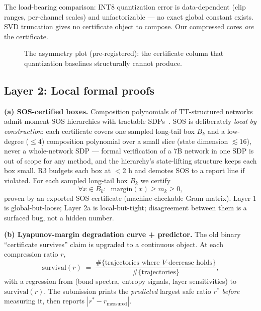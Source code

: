 \documentclass[conference,10pt]{IEEEtran}
\begin{document}
The load-bearing comparison: INT8 quantization error is data-dependent
(clip ranges, per-channel scales) and unfactorizable --- no exact global
constant exists. SVD truncation gives no certificate object to compose. Our
compressed cores \emph{are} the certificate.

\begin{figure}[!t]
\centering
{}
\caption{The asymmetry plot (pre-registered): the certificate column that
quantization baselines structurally cannot produce.}
\label{fig:safeset}
\end{figure}

\subsection{Layer 2: Local formal proofs}

\textbf{(a) SOS-certified boxes.} Composition polynomials of TT-structured
networks admit moment-SOS hierarchies with tractable SDPs~\cite{sos-tt}.
SOS is deliberately \emph{local by construction}: each certificate covers one
sampled long-tail box $B_k$ and a low-degree ($\le 4$) composition polynomial
over a small slice (state dimension $\lesssim 16$), never a whole-network SDP
--- formal verification of a 7B network in one SDP is out of scope for any
method, and the hierarchy's state-lifting structure keeps each box small.
R3 budgets each box at $<$2 h and demotes SOS to a report line if violated.
For each sampled long-tail box $B_k$ we certify
\begin{equation}
\forall x \in B_k:\;\; \mathrm{margin}(x) \ge m_k \ge 0,
\end{equation}
proven by an exported SOS certificate (machine-checkable Gram matrix).
Layer 1 is global-but-loose; Layer 2a is local-but-tight; disagreement between
them is a surfaced bug, not a hidden number.

\textbf{(b) Lyapunov-margin degradation curve + predictor.} The old binary
``certificate survives'' claim is upgraded to a continuous object. At each
compression ratio $r$,
\begin{equation}
\mathrm{survival}(r) \;=\; \frac{\#\{\text{trajectories where } V\text{-decrease holds}\}}
{\#\{\text{trajectories}\}},
\end{equation}
with a regression from (bond spectra, entropy signals, layer sensitivities) to
$\mathrm{survival}(r)$. The submission prints the \emph{predicted} largest safe
ratio $r^*$ \emph{before} measuring it, then reports
$|r^* - r_{\mathrm{measured}}|$.
\end{document}
